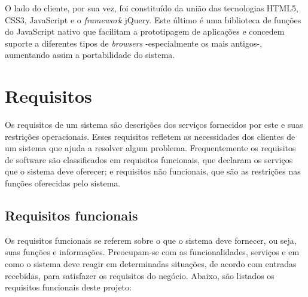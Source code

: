 O lado do cliente, por sua vez, foi constituído da união das tecnologias HTML5, CSS3, JavaScript e o \textit{framework} jQuery. Este último é uma biblioteca de funções do JavaScript nativo que facilitam a prototipagem de aplicações e concedem suporte a diferentes tipos de \textit{browsers} -especialmente os mais antigos-, aumentando assim a portabilidade do sistema.


\section{Requisitos}
\label{metodologiaRequisitos}
Os requisitos de um sistema são descrições dos serviços fornecidos por este e suas restrições operacionais. Esses requisitos refletem as necessidades dos clientes de um sistema que ajuda a resolver algum problema. Frequentemente os requisitos de software são classificados em requisitos funcionais, que declaram os serviços que o sistema deve oferecer; e requisitos não funcionais, que são as restrições nas funções oferecidas pelo sistema. 

\subsection{Requisitos funcionais}
\label{requisitosRF}
Os requisitos funcionais se referem sobre o que o sistema deve fornecer, ou seja, suas funções e informações. Preocupam-se com as funcionalidades, serviços e em como o sistema deve reagir em determinadas situações, de acordo com entradas recebidas, para satisfazer os requisitos do negócio. Abaixo, são listados os requisitos funcionais deste projeto:  

